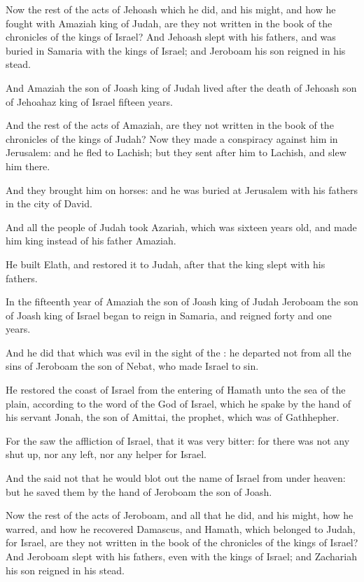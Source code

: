 \Verse Now the rest of the acts of Jehoash which he did, and his might, and how he fought with Amaziah king of Judah, are they not written in the book of the chronicles of the kings of Israel?  \Verse And Jehoash slept with his fathers, and was buried in Samaria with the kings of Israel; and Jeroboam his son reigned in his stead.

\Verse And Amaziah the son of Joash king of Judah lived after the death of Jehoash son of Jehoahaz king of Israel fifteen years.

\Verse And the rest of the acts of Amaziah, are they not written in the book of the chronicles of the kings of Judah?  \Verse Now they made a conspiracy against him in Jerusalem: and he fled to Lachish; but they sent after him to Lachish, and slew him there.

\Verse And they brought him on horses: and he was buried at Jerusalem with his fathers in the city of David.

\Verse And all the people of Judah took Azariah, which was sixteen years old, and made him king instead of his father Amaziah.

\Verse He built Elath, and restored it to Judah, after that the king slept with his fathers.

\Verse In the fifteenth year of Amaziah the son of Joash king of Judah Jeroboam the son of Joash king of Israel began to reign in Samaria, and reigned forty and one years.

\Verse And he did that which was evil in the sight of the \LORD: he departed not from all the sins of Jeroboam the son of Nebat, who made Israel to sin.

\Verse He restored the coast of Israel from the entering of Hamath unto the sea of the plain, according to the word of the \LORD God of Israel, which he spake by the hand of his servant Jonah, the son of Amittai, the prophet, which was of Gathhepher.

\Verse For the \LORD saw the affliction of Israel, that it was very bitter: for there was not any shut up, nor any left, nor any helper for Israel.

\Verse And the \LORD said not that he would blot out the name of Israel from under heaven: but he saved them by the hand of Jeroboam the son of Joash.

\Verse Now the rest of the acts of Jeroboam, and all that he did, and his might, how he warred, and how he recovered Damascus, and Hamath, which belonged to Judah, for Israel, are they not written in the book of the chronicles of the kings of Israel?  \Verse And Jeroboam slept with his fathers, even with the kings of Israel; and Zachariah his son reigned in his stead.


